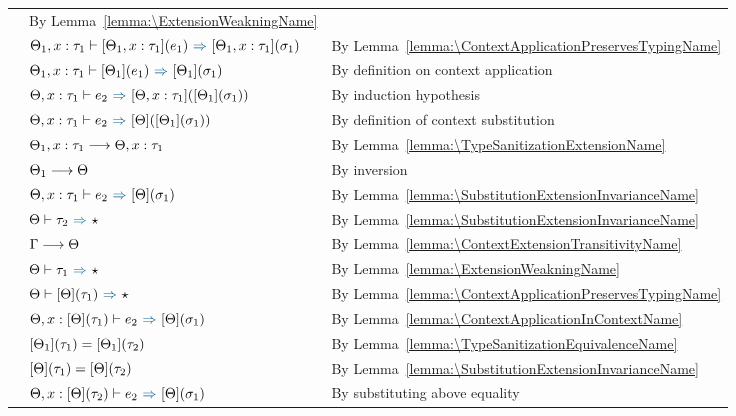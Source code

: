 \begin{itemize}
\begin{longtable}[l]{lll}
      & By Lemma~\ref{lemma:\ExtensionWeakningName} \\
      & $\ctxl_1, x: \tau_1 \byinf \applye {\ctxl_1, x: \tau_1} {e_1}
      \infto \applye {\ctxl_1, x : \tau_1} {\sigma_1}$
      & By Lemma~\ref{lemma:\ContextApplicationPreservesTypingName} \\
      & $\ctxl_1, x: \tau_1 \byinf \applye {\ctxl_1} {e_1}
      \infto \applye {\ctxl_1} {\sigma_1}$
      & By definition on context application \\
      & $\ctxl, x:\tau_1 \byinf e_2 \infto \applye {\ctxl, x :\tau_1} {\applye {\ctxl_1} {\sigma_1}}$
      & By induction hypothesis \\
      & $\ctxl, x:\tau_1 \byinf e_2 \infto \applye {\ctxl} {\applye {\ctxl_1} {\sigma_1}}$
      & By definition of context substitution \\
      & $\Theta_1, x:\tau_1 \longrightarrow \Theta, x : \tau_1$
      & By Lemma~\ref{lemma:\TypeSanitizationExtensionName} \\
      & $\Theta_1 \longrightarrow \Theta$
      & By inversion \\
      & $\ctxl, x: \tau_1 \byinf e_2 \infto \applye {\ctxl} {\sigma_1}$
      & By Lemma~\ref{lemma:\SubstitutionExtensionInvarianceName} \\
      & $\ctxl \byinf \tau_2 \infto \star$
      & By Lemma~\ref{lemma:\SubstitutionExtensionInvarianceName} \\
      & $\Gamma \longrightarrow \Theta$
      & By Lemma~\ref{lemma:\ContextExtensionTransitivityName} \\
      & $\ctxl \byinf \tau_1 \infto \star$
      & By Lemma~\ref{lemma:\ExtensionWeakningName} \\
      & $\ctxl \byinf \applye {\ctxl} {\tau_1} \infto \star$
      & By Lemma~\ref{lemma:\ContextApplicationPreservesTypingName} \\
      & $\ctxl, x: \applye \ctxl {\tau_1} \byinf e_2 \infto \applye {\ctxl} {\sigma_1}$
      & By Lemma~\ref{lemma:\ContextApplicationInContextName} \\
      & $[\Theta_1](\tau_1) = [\Theta_1](\tau_2) $
      & By Lemma~\ref{lemma:\TypeSanitizationEquivalenceName} \\
      & $[\Theta](\tau_1) = [\Theta](\tau_2) $
      & By Lemma~\ref{lemma:\SubstitutionExtensionInvarianceName} \\
      & $\ctxl, x: \applye \ctxl {\tau_2} \byinf e_2 \infto \applye {\ctxl} {\sigma_1}$
      & By substituting above equality \\

\end{longtable}
\end{itemize}
